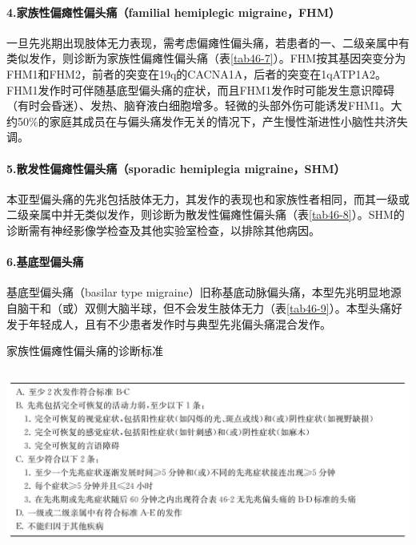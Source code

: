 \paragraph{4.家族性偏瘫性偏头痛（familial hemiplegic migraine，FHM）}

一旦先兆期出现肢体无力表现，需考虑偏瘫性偏头痛，若患者的一、二级亲属中有类似发作，则诊断为家族性偏瘫性偏头痛（表\ref{tab46-7}）。FHM按其基因突变分为FHM1和FHM2，前者的突变在19q的CACNA1A，后者的突变在1qATP1A2。FHM1发作时可伴随基底型偏头痛的症状，而且FHM1发作时可能发生意识障碍（有时会昏迷）、发热、脑脊液白细胞增多。轻微的头部外伤可能诱发FHM1。大约50\%的家庭其成员在与偏头痛发作无关的情况下，产生慢性渐进性小脑性共济失调。

\paragraph{5.散发性偏瘫性偏头痛（sporadic hemiplegia migraine，SHM）}

本亚型偏头痛的先兆包括肢体无力，其发作的表现也和家族性者相同，而其一级或二级亲属中并无类似发作，则诊断为散发性偏瘫性偏头痛（表\ref{tab46-8}）。SHM的诊断需有神经影像学检查及其他实验室检查，以排除其他病因。

\paragraph{6.基底型偏头痛}

基底型偏头痛（basilar type
migraine）旧称基底动脉偏头痛，本型先兆明显地源自脑干和（或）双侧大脑半球，但不会发生肢体无力（表\ref{tab46-9}）。本型头痛好发于年轻成人，且有不少患者发作时与典型先兆偏头痛混合发作。

\begin{table}[htbp]
\centering
\caption{家族性偏瘫性偏头痛的诊断标准}
\label{tab46-7}
\includegraphics[width=5.94792in,height=2.32292in]{./images/Image00283.jpg}
\end{table}

